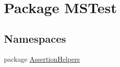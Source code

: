 \hypertarget{namespace_m_s_test}{\section{Package M\-S\-Test}
\label{namespace_m_s_test}
}
\subsection*{Namespaces}
\begin{DoxyCompactItemize}
\item 
package \hyperlink{namespace_m_s_test_1_1_assertion_helpers}{Assertion\-Helpers}
\end{DoxyCompactItemize}
